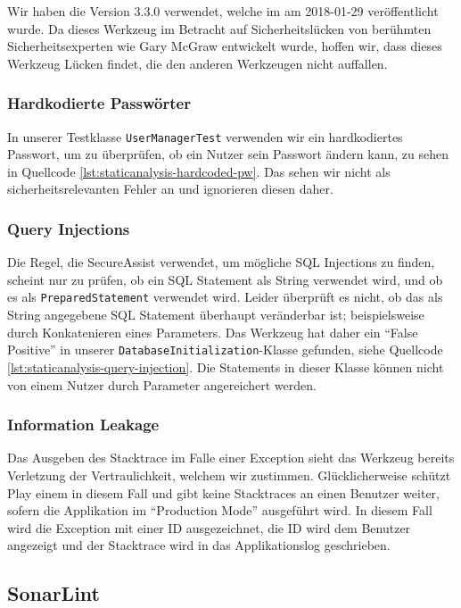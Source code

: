 \documentclass[12pt,DIV14,BCOR10mm,a4paper,twoside,parskip=half-,headsepline,headinclude,english,ngerman,bibliography=totocnumbered]{scrreprt}
\begin{document}
Wir haben die Version 3.3.0 verwendet, welche im am 2018-01-29 veröffentlicht wurde.
Da dieses Werkzeug im Betracht auf Sicherheitslücken von berühmten Sicherheitsexperten wie Gary McGraw entwickelt wurde, hoffen wir, dass dieses Werkzeug Lücken findet, die den anderen Werkzeugen nicht auffallen.

\subsubsection{Hardkodierte Passwörter}

In unserer Testklasse \texttt{UserManagerTest} verwenden wir ein hardkodiertes Passwort, um zu überprüfen, ob ein Nutzer sein Passwort ändern kann, zu sehen in Quellcode \ref{lst:staticanalysis-hardcoded-pw}.
Das sehen wir nicht als sicherheitsrelevanten Fehler an und ignorieren diesen daher.

\subsubsection{Query Injections}

Die Regel, die SecureAssist verwendet, um mögliche SQL Injections zu finden, scheint nur zu prüfen, ob ein SQL Statement als String verwendet wird, und ob es als \texttt{PreparedStatement} verwendet wird.
Leider überprüft es nicht, ob das als String angegebene SQL Statement überhaupt veränderbar ist; beispielsweise durch Konkatenieren eines Parameters.
Das Werkzeug hat daher ein \enquote{False Positive} in unserer \texttt{DatabaseInitialization}-Klasse gefunden, siehe Quellcode \ref{lst:staticanalysis-query-injection}.
Die Statements in dieser Klasse können nicht von einem Nutzer durch Parameter angereichert werden.

\subsubsection{Information Leakage}

Das Ausgeben des Stacktrace im Falle einer Exception sieht das Werkzeug bereits Verletzung der Vertraulichkeit, welchem wir zustimmen.
Glücklicherweise schützt Play einem in diesem Fall und gibt keine Stacktraces an einen Benutzer weiter, sofern die Applikation im \enquote{Production Mode} ausgeführt wird.
In diesem Fall wird die Exception mit einer ID ausgezeichnet, die ID wird dem Benutzer angezeigt und der Stacktrace wird in das Applikationslog geschrieben.

\subsection{SonarLint}
\end{document}
